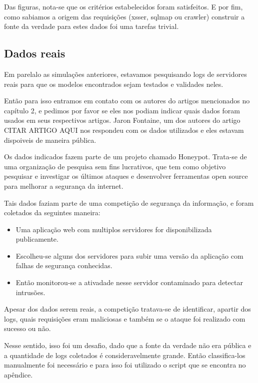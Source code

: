 Das figuras, nota-se que os critérios estabelecidos foram satisfeitos. E por fim, 
como sabiamos a origem das requisições (xsser, sqlmap ou crawler) construir a fonte 
da verdade para estes dados foi uma tarefas trivial.

\subsection{Dados reais}

Em parelalo as simulações anteriores, estavamos pesquisando logs de servidores reais para que os modelos 
encontrados sejam testados e validades neles. 

Então para isso entramos em contato com os autores do artigos mencionados no capítulo 2, e 
pedimos por favor se eles nos podiam indicar quais dados foram usados em seus respectivos artigos. Jaron Fontaine, um dos autores
do artigo CITAR ARTIGO AQUI nos respondeu com os dados utilizados e eles estavam dispoiveis de
maneira pública. 

Os dados indicados fazem parte de um projeto chamado Honeypot. Trata-se de uma organização de pesquisa 
sem fins lucrativos, que tem como objetivo pesquisar e investigar os últimos ataques e desenvolver
ferramentas open source para melhorar a segurança da internet.

Tais dados faziam parte de uma competição de segurança da informação, e foram coletados da seguintes maneira:

\begin{itemize}
    \item Uma aplicação web com multiplos servidores for disponibilizada publicamente.
    \item Escolheu-se alguns dos servidores para subir uma versão da aplicação 
    com falhas de segurança conhecidas.
    \item Então monitorou-se a ativadade nesse servidor contaminado para detectar intrusões.
\end{itemize}

Apesar dos dados serem reais, a competição tratava-se de identificar, apartir dos logs, quais requisições 
eram maliciosas e também se o ataque foi realizado com sucesso ou não. 

Nesse sentido, isso foi um desafio, dado que a fonte da verdade não era pública e a quantidade de logs 
coletados é consideravelmente grande. Então classifica-los manualmente foi necessário e para 
isso foi utilizado o script que se encontra no apêndice.

